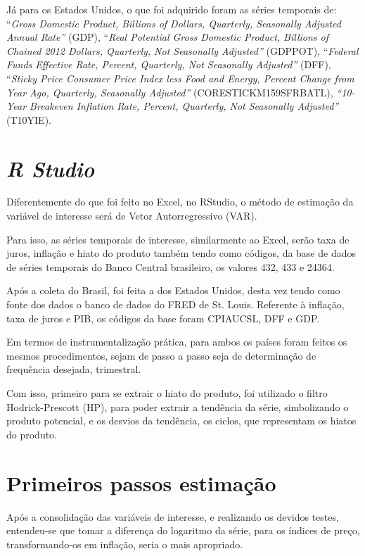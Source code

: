  J\'{a} para os Estados Unidos, o que foi adquirido foram as s\'{e}ries temporais de: ``\textit{Gross Domestic Product, Billions of Dollars, Quarterly, Seasonally Adjusted Annual Rate'' }(GDP), ``\textit{Real Potential Gross Domestic Product, Billions of Chained 2012 Dollars, Quarterly, Not Seasonally Adjusted'' }(GDPPOT), ``\textit{Federal Funds Effective Rate, Percent, Quarterly, Not Seasonally Adjusted''} (DFF), ``\textit{Sticky Price Consumer Price Index less Food and Energy, Percent Change from Year Ago, Quarterly, Seasonally Adjusted'' }(CORESTICKM159SFRBATL), \textit{``10-Year Breakeven Inflation Rate, Percent, Quarterly, Not Seasonally Adjusted''} (T10YIE). 

\section{\textit{R Studio}}

 Diferentemente do que foi feito no Excel, no RStudio, o m\'{e}todo de estima\c{c}\~{a}o da vari\'{a}vel de interesse ser\'{a} de Vetor Autorregressivo (VAR).

 Para isso, as s\'{e}ries temporais de interesse, similarmente ao Excel, ser\~{a}o taxa de juros, infla\c{c}\~{a}o e hiato do produto tamb\'{e}m tendo como c\'{o}digos, da base de dados de s\'{e}ries temporais do Banco Central brasileiro, os valores 432, 433 e 24364. 

 Ap\'{o}s a coleta do Brasil, foi feita a dos Estados Unidos, desta vez tendo como fonte dos dados o banco de dados do FRED de St. Louis. Referente \`{a} infla\c{c}\~{a}o, taxa de juros e PIB, os c\'{o}digos da base foram CPIAUCSL, DFF e GDP.

 Em termos de instrumentaliza\c{c}\~{a}o pr\'{a}tica, para ambos os pa\'{i}ses foram feitos os mesmos procedimentos, sejam de passo a passo seja de determina\c{c}\~{a}o de frequ\^{e}ncia desejada, trimestral. 


 Com isso, primeiro para se extrair o hiato do produto, foi utilizado o filtro Hodrick-Prescott (HP), para poder extrair a tend\^{e}ncia da s\'{e}rie, simbolizando o produto potencial, e os desvios da tend\^{e}ncia, os ciclos, que representam os hiatos do produto. 

\section{Primeiros passos estima\c{c}\~{a}o}

\textit{ }Ap\'{o}s a consolida\c{c}\~{a}o das vari\'{a}veis de interesse, e realizando os devidos testes, entendeu-se que tomar a diferen\c{c}a do logaritmo da s\'{e}rie, para os \'{i}ndices de pre\c{c}o, transformando-os em infla\c{c}\~{a}o, seria o mais apropriado. 

